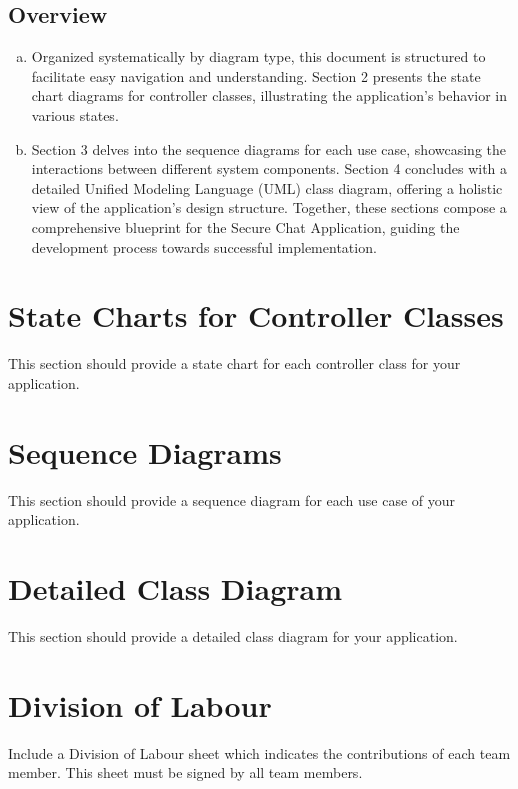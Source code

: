 \documentclass[]{article}
\begin{document}
\subsection{Overview}
\label{sub:overview}
\begin{enumerate}[a)]
    \item Organized systematically by diagram type, this document is structured to facilitate easy navigation and understanding. Section 2 presents the state chart diagrams for controller classes, illustrating the application's behavior in various states.
    \item Section 3 delves into the sequence diagrams for each use case, showcasing the interactions between different system components. Section 4 concludes with a detailed Unified Modeling Language (UML) class diagram, offering a holistic view of the application's design structure. Together, these sections compose a comprehensive blueprint for the Secure Chat Application, guiding the development process towards successful implementation.
\end{enumerate}



\section{State Charts for Controller Classes}
\label{sec:state_charts_for_controller_classes}
This section should provide a state chart for each controller class for your application.

\section{Sequence Diagrams}
\label{sec:sequence_diagrams}
This section should provide a sequence diagram for each use case of your application.

\section{Detailed Class Diagram}
\label{sec:detailed_class_diagram}
This section should provide a detailed class diagram for your application.

\appendix
\section{Division of Labour}
\label{sec:division_of_labour}
Include a Division of Labour sheet which indicates the contributions of each team member. This sheet must be signed by all team members.
\end{document}
